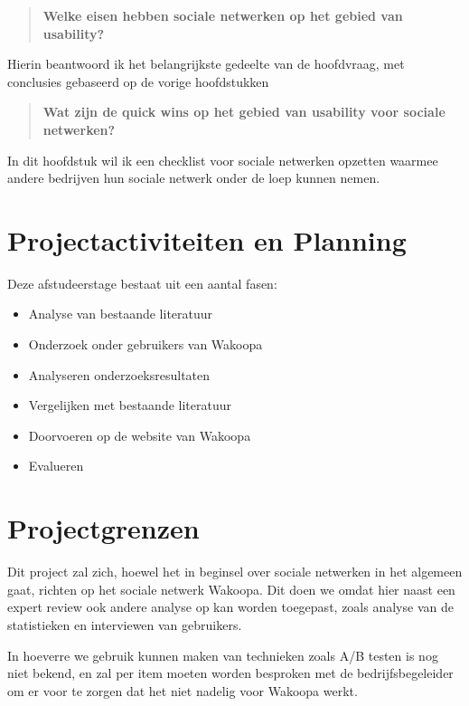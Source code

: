 \documentclass[a4paper, 10pt, twoside, pdftex]{article}
\begin{document}
\begin{quote}
\textbf{Welke eisen hebben sociale netwerken op het gebied van usability?}
\end{quote}
Hierin beantwoord ik het belangrijkste gedeelte van de hoofdvraag, met conclusies gebaseerd op de vorige hoofdstukken


\begin{quote}
\textbf{Wat zijn de quick wins op het gebied van usability voor sociale netwerken?}
\end{quote}
In dit hoofdstuk wil ik een checklist voor sociale netwerken opzetten waarmee andere bedrijven hun sociale netwerk onder de loep kunnen nemen.

\section{Projectactiviteiten en Planning}
Deze afstudeerstage bestaat uit een aantal fasen:

\begin{itemize}
\item
Analyse van bestaande literatuur
\item
Onderzoek onder gebruikers van Wakoopa
\item
Analyseren onderzoeksresultaten
\item
Vergelijken met bestaande literatuur
\item
Doorvoeren op de website van Wakoopa
\item
Evalueren
\end{itemize}

\section{Projectgrenzen}
Dit project zal zich, hoewel het in beginsel over sociale netwerken in het algemeen gaat, richten op het sociale netwerk Wakoopa. Dit doen we omdat hier naast een expert review ook andere analyse op kan worden toegepast, zoals analyse van de statistieken en interviewen van gebruikers.

In hoeverre we gebruik kunnen maken van technieken zoals A/B testen is nog niet bekend, en zal per item moeten worden besproken met de bedrijfsbegeleider om er voor te zorgen dat het niet nadelig voor Wakoopa werkt.
\end{document}
